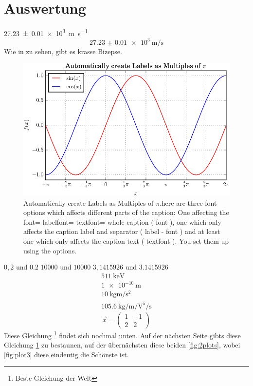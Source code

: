 \section{Auswertung}
\SI{27.23(1)e3}{\meter\per\second}
\begin{equation}
  \SI{27.23(1)e3}{\meter\per\second}
\end{equation}
Wie in \cite[4]{hallo} zu sehen, gibt es krasse Bizepse.
\begin{figure}
    \centering
    \includegraphics[width=\textwidth]{plot1.pdf}
    \caption{Automatically create Labels as Multiples of $\pi$.here are three font options which affects different parts of the caption: One affecting the
font=
labelfont=
textfont=
whole caption (
font
), one which only affects the caption label and separator (
label
-
font
) and at least one which only affects the caption text (
textfont
).  You set them
up using the options.}
    \label{fig:plot1}
\end{figure}
$0,2$ und $\num{0,2}$
$10000$ und $\num{10000}$
$3,1415926$ und $\num{3,1415926}$
\begin{gather}
  \SI{511}{\kilo\electronvolt} \\
  \SI{1e-10}{\metre} \\
  \SI{10}{\kilo\gram\meter\per\second\squared} \\
  \SI{105.6}{\kilo\gram\per\meter\per\volt\tothe{5}\per\second}
\end{gather}
\begin{equation}
  \vec{x} = \begin{pmatrix}
  1 & -1 \\
  2 & 2
  \end{pmatrix}
  \label{gleichung2}
\end{equation}
Diese Gleichung \footnote{Beste Gleichung der Welt} findet sich nochmal unten.
Auf der nächsten Seite gibts diese Gleichung \ref{fig:plot1} zu bestaunen, auf der übernächsten diese beiden \ref{fig:2plots},
wobei \ref{fig:plot3} diese eindeutig die Schönste ist.
\newpage
